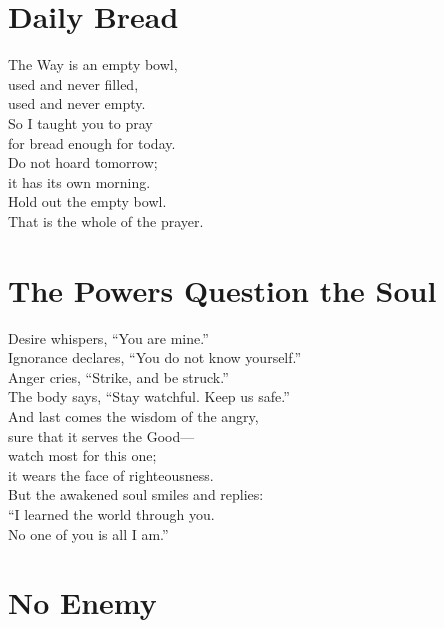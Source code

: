 \documentclass[10pt, openright]{book}
\newcommand{\sectionbreak}{\filbreak}
\newcommand{\sayingsource}[1]{\par\nopagebreak\vspace{0.3\baselineskip}{\raggedleft\footnotesize\itshape #1\par}}
\begin{document}
\sayingsource{Tao Te Ching 4 · Thomas 50 · James 1:17}

\sectionbreak

\section{Daily Bread}\label{daily-bread}

The Way is an empty bowl,\\
used and never filled,\\
used and never empty.\\
So I taught you to pray\\
for bread enough for today.\\
Do not hoard tomorrow;\\
it has its own morning.\\
Hold out the empty bowl.\\
That is the whole of the prayer.

\sayingsource{Tao Te Ching 4 · Didache 8}

\sectionbreak

\section{The Powers Question the
Soul}\label{the-powers-question-the-soul}

Desire whispers, ``You are mine.''\\
Ignorance declares, ``You do not know yourself.''\\
Anger cries, ``Strike, and be struck.''\\
The body says, ``Stay watchful. Keep us safe.''\\
And last comes the wisdom of the angry,\\
sure that it serves the Good---\\
watch most for this one;\\
it wears the face of righteousness.\\
But the awakened soul smiles and replies:\\
``I learned the world through you.\\
No one of you is all I am.''

\sayingsource{Mary 15--17}

\sectionbreak

\section{No Enemy}\label{no-enemy}
\end{document}
